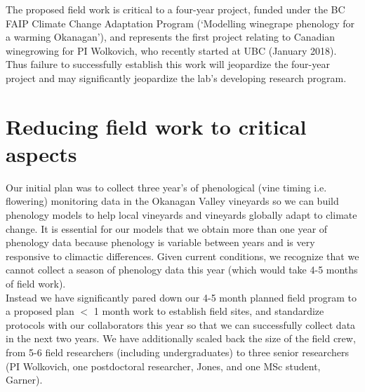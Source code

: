 \documentclass[11pt,letter]{article}
\begin{document}
The proposed field work is critical to a four-year project, funded under the BC FAIP Climate Change Adaptation Program (`Modelling winegrape phenology for a warming Okanagan'), and represents the first project relating to Canadian winegrowing for PI Wolkovich, who recently started at UBC (January 2018). Thus failure to successfully establish this work will jeopardize the four-year project and may significantly jeopardize the lab's developing research program. 

\section{Reducing field work to critical aspects}
Our initial plan was to collect three year's of phenological (vine timing i.e. flowering) monitoring data in the Okanagan Valley vineyards so we can build phenology models to help local vineyards and vineyards globally adapt to climate change. It is essential for our models that we obtain more than one year of phenology data because phenology is variable between years and is very responsive to climactic differences. Given current conditions, we recognize that we cannot collect a season of phenology data this year (which would take 4-5 months of field work).\\ 

Instead we have significantly pared down our 4-5 month planned field program to a proposed plan $<$ 1 month work to establish field sites, and standardize protocols with our collaborators this year so that we can successfully collect data in the next two years. We have additionally scaled back the size of the field crew, from 5-6 field researchers (including undergraduates) to three senior researchers (PI Wolkovich, one postdoctoral researcher, Jones, and one MSc student, Garner).\\
\end{document}
